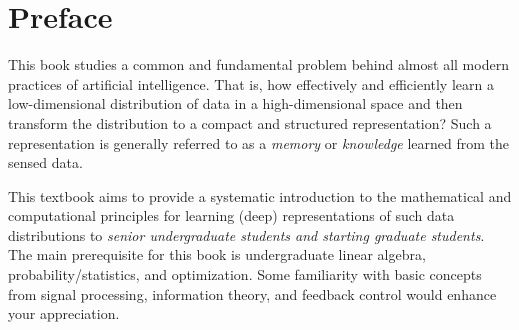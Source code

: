 \documentclass[../../book-main.tex]{subfiles}
\begin{document}
\chapter*{Preface}

This book studies a common and fundamental problem behind almost all modern practices of artificial intelligence. That is, how effectively and efficiently learn a low-dimensional distribution of data in a high-dimensional space and then transform the distribution to a compact and structured representation? Such a representation is  generally referred to as a {\em memory} or {\em knowledge} learned from the sensed data. 

This textbook aims to provide a systematic introduction to the mathematical and computational principles for learning (deep) representations of such data distributions to {\em senior undergraduate students and starting graduate students}. The main prerequisite for this book is undergraduate linear algebra, probability/statistics, and optimization. Some familiarity with basic concepts from signal processing, information theory, and feedback control would enhance your appreciation. 
\end{document}
